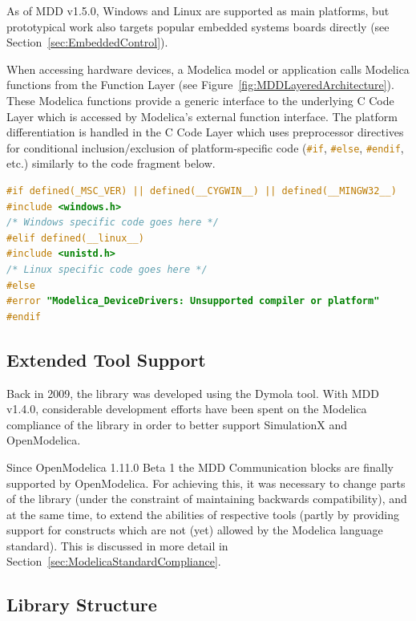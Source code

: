 \documentclass{resources/modelica}
\newcommand{\clang}[1]{\lstinline[language=c]|#1|}
\begin{document}
As of MDD v1.5.0, Windows and Linux are supported as main platforms,
but prototypical work also targets popular embedded systems boards directly (see
Section~\ref{sec:EmbeddedControl}).

When accessing hardware devices, a Modelica model or
application calls Modelica functions from the \textsf{Function Layer} (see
Figure~\ref{fig:MDDLayeredArchitecture}). These Modelica functions provide a
generic interface to the underlying \textsf{C Code Layer} which is accessed by
Modelica's external function interface.
The platform differentiation is handled in the \textsf{C Code Layer} which
uses preprocessor directives for conditional inclusion/exclusion of
platform-specific code (\mbox{\clang{#if}}, \mbox{\clang{#else}},
\mbox{\clang{#endif}}, etc.) similarly to the code fragment below.
\begin{lstlisting}[language=C]
#if defined(_MSC_VER) || defined(__CYGWIN__) || defined(__MINGW32__)
#include <windows.h>
/* Windows specific code goes here */
#elif defined(__linux__)
#include <unistd.h>
/* Linux specific code goes here */
#else
#error "Modelica_DeviceDrivers: Unsupported compiler or platform"
#endif
\end{lstlisting}

\subsection{Extended Tool Support}
\label{sec:ExtendedToolSupport}

Back in 2009, the library was developed using the Dymola tool. With MDD v1.4.0,
considerable development efforts have been spent on the Modelica compliance of
the library in order to better support SimulationX and OpenModelica.

Since OpenModelica 1.11.0 Beta 1 the MDD Communication blocks are finally
supported by OpenModelica. For achieving this, it was necessary to change parts
of the library (under the constraint of maintaining backwards compatibility),
and at the same time, to extend the abilities of respective tools (partly by
providing support for constructs which are not (yet) allowed by the Modelica
language standard). This is discussed in more detail in
Section~\ref{sec:ModelicaStandardCompliance}.


\subsection{Library Structure}
\label{sec:LibraryStructure}
\end{document}
